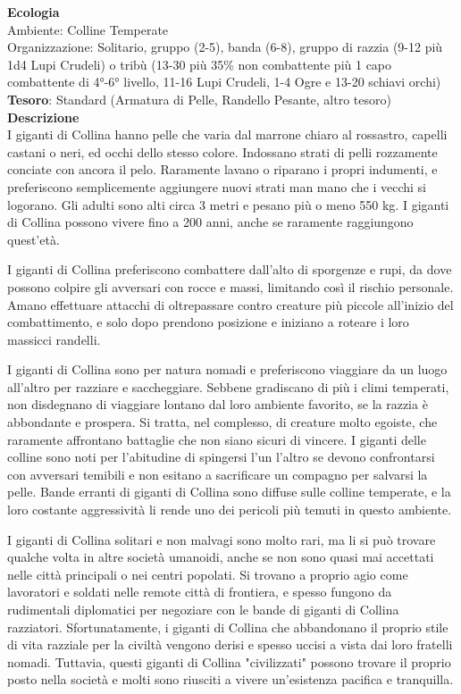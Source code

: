 \begin{multicols}{2}
	\textbf{Ecologia}\\
	Ambiente: Colline Temperate\\
	Organizzazione: Solitario, gruppo (2-5), banda (6-8), gruppo di razzia (9-12 più 1d4 Lupi Crudeli) o tribù (13-30 più 35\% non combattente più 1 capo combattente di 4°-6° livello, 11-16 Lupi Crudeli, 1-4 Ogre e 13-20 schiavi orchi)\\
	\textbf{Tesoro}: Standard (Armatura di Pelle, Randello Pesante, altro tesoro)\\
	\textbf{Descrizione}\\
	I giganti di Collina hanno pelle che varia dal marrone chiaro al rossastro, capelli castani o neri, ed occhi dello stesso colore. Indossano strati di pelli rozzamente conciate con ancora il pelo. Raramente lavano o riparano i propri indumenti, e preferiscono semplicemente aggiungere nuovi strati man mano che i vecchi si logorano. Gli adulti sono alti circa 3 metri e pesano più o meno 550 kg. I giganti di Collina possono vivere fino a 200 anni, anche se raramente raggiungono quest'età.

	I giganti di Collina preferiscono combattere dall'alto di sporgenze e rupi, da dove possono colpire gli avversari con rocce e massi, limitando così il rischio personale. Amano effettuare attacchi di oltrepassare contro creature più piccole all'inizio del combattimento, e solo dopo prendono posizione e iniziano a roteare i loro massicci randelli.

	I giganti di Collina sono per natura nomadi e preferiscono viaggiare da un luogo all'altro per razziare e saccheggiare. Sebbene gradiscano di più i climi temperati, non disdegnano di viaggiare lontano dal loro ambiente favorito, se la razzia è abbondante e prospera. Si tratta, nel complesso, di creature molto egoiste, che raramente affrontano battaglie che non siano sicuri di vincere. I giganti delle colline sono noti per l'abitudine di spingersi l'un l'altro se devono confrontarsi con avversari temibili e non esitano a sacrificare un compagno per salvarsi la pelle. Bande erranti di giganti di Collina sono diffuse sulle colline temperate, e la loro costante aggressività li rende uno dei pericoli più temuti in questo ambiente.


	I giganti di Collina solitari e non malvagi sono molto rari, ma li si può trovare qualche volta in altre società umanoidi, anche se non sono quasi mai accettati nelle città principali o nei centri popolati. Si trovano a proprio agio come lavoratori e soldati nelle remote città di frontiera, e spesso fungono da rudimentali diplomatici per negoziare con le bande di giganti di Collina razziatori. Sfortunatamente, i giganti di Collina che abbandonano il proprio stile di vita razziale per la civiltà vengono derisi e spesso uccisi a vista dai loro fratelli nomadi. Tuttavia, questi giganti di Collina "civilizzati" possono trovare il proprio posto nella società e molti sono riusciti a vivere un'esistenza pacifica e tranquilla.



\end{multicols}
